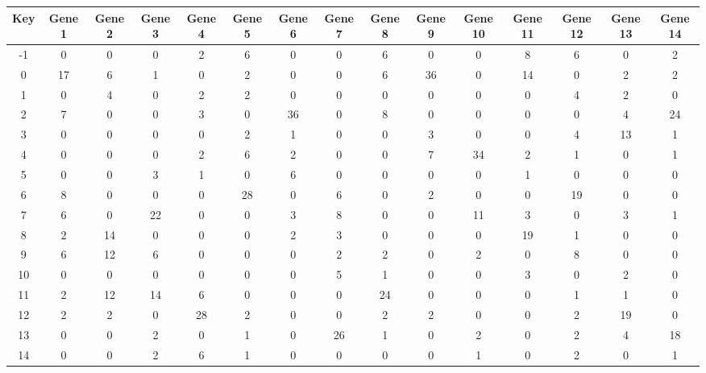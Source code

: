 \begin{tabular}{|c|c|c|c|c|c|c|c|c|c|c|c|c|c|c|}
\hline
Key & Gene 1 & Gene 2 & Gene 3 & Gene 4 & Gene 5 & Gene 6 & Gene 7 & Gene 8 & Gene 9 & Gene 10 & Gene 11 & Gene 12 & Gene 13 & Gene 14 \\
\hline
-1 & 0 & 0 & 0 & 2 & 6 & 0 & 0 & 6 & 0 & 0 & 8 & 6 & 0 & 2 \\
0 & 17 & 6 & 1 & 0 & 2 & 0 & 0 & 6 & 36 & 0 & 14 & 0 & 2 & 2 \\
1 & 0 & 4 & 0 & 2 & 2 & 0 & 0 & 0 & 0 & 0 & 0 & 4 & 2 & 0 \\
2 & 7 & 0 & 0 & 3 & 0 & 36 & 0 & 8 & 0 & 0 & 0 & 0 & 4 & 24 \\
3 & 0 & 0 & 0 & 0 & 2 & 1 & 0 & 0 & 3 & 0 & 0 & 4 & 13 & 1 \\
4 & 0 & 0 & 0 & 2 & 6 & 2 & 0 & 0 & 7 & 34 & 2 & 1 & 0 & 1 \\
5 & 0 & 0 & 3 & 1 & 0 & 6 & 0 & 0 & 0 & 0 & 1 & 0 & 0 & 0 \\
6 & 8 & 0 & 0 & 0 & 28 & 0 & 6 & 0 & 2 & 0 & 0 & 19 & 0 & 0 \\
7 & 6 & 0 & 22 & 0 & 0 & 3 & 8 & 0 & 0 & 11 & 3 & 0 & 3 & 1 \\
8 & 2 & 14 & 0 & 0 & 0 & 2 & 3 & 0 & 0 & 0 & 19 & 1 & 0 & 0 \\
9 & 6 & 12 & 6 & 0 & 0 & 0 & 2 & 2 & 0 & 2 & 0 & 8 & 0 & 0 \\
10 & 0 & 0 & 0 & 0 & 0 & 0 & 5 & 1 & 0 & 0 & 3 & 0 & 2 & 0 \\
11 & 2 & 12 & 14 & 6 & 0 & 0 & 0 & 24 & 0 & 0 & 0 & 1 & 1 & 0 \\
12 & 2 & 2 & 0 & 28 & 2 & 0 & 0 & 2 & 2 & 0 & 0 & 2 & 19 & 0 \\
13 & 0 & 0 & 2 & 0 & 1 & 0 & 26 & 1 & 0 & 2 & 0 & 2 & 4 & 18 \\
14 & 0 & 0 & 2 & 6 & 1 & 0 & 0 & 0 & 0 & 1 & 0 & 2 & 0 & 1 \\
\hline
\end{tabular}